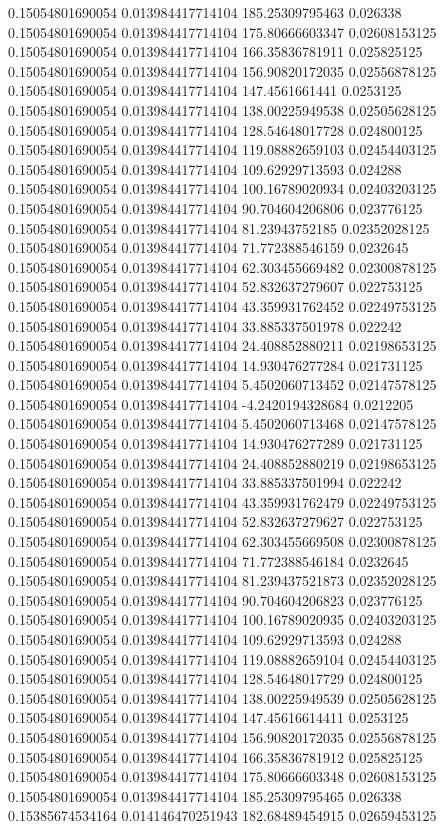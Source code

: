 0.15054801690054 0.013984417714104 185.25309795463 0.026338
0.15054801690054 0.013984417714104 175.80666603347 0.02608153125
0.15054801690054 0.013984417714104 166.35836781911 0.025825125
0.15054801690054 0.013984417714104 156.90820172035 0.02556878125
0.15054801690054 0.013984417714104 147.4561661441 0.0253125
0.15054801690054 0.013984417714104 138.00225949538 0.02505628125
0.15054801690054 0.013984417714104 128.54648017728 0.024800125
0.15054801690054 0.013984417714104 119.08882659103 0.02454403125
0.15054801690054 0.013984417714104 109.62929713593 0.024288
0.15054801690054 0.013984417714104 100.16789020934 0.02403203125
0.15054801690054 0.013984417714104 90.704604206806 0.023776125
0.15054801690054 0.013984417714104 81.23943752185 0.02352028125
0.15054801690054 0.013984417714104 71.772388546159 0.0232645
0.15054801690054 0.013984417714104 62.303455669482 0.02300878125
0.15054801690054 0.013984417714104 52.832637279607 0.022753125
0.15054801690054 0.013984417714104 43.359931762452 0.02249753125
0.15054801690054 0.013984417714104 33.885337501978 0.022242
0.15054801690054 0.013984417714104 24.408852880211 0.02198653125
0.15054801690054 0.013984417714104 14.930476277284 0.021731125
0.15054801690054 0.013984417714104 5.4502060713452 0.02147578125
0.15054801690054 0.013984417714104 -4.2420194328684 0.0212205
0.15054801690054 0.013984417714104 5.4502060713468 0.02147578125
0.15054801690054 0.013984417714104 14.930476277289 0.021731125
0.15054801690054 0.013984417714104 24.408852880219 0.02198653125
0.15054801690054 0.013984417714104 33.885337501994 0.022242
0.15054801690054 0.013984417714104 43.359931762479 0.02249753125
0.15054801690054 0.013984417714104 52.832637279627 0.022753125
0.15054801690054 0.013984417714104 62.303455669508 0.02300878125
0.15054801690054 0.013984417714104 71.772388546184 0.0232645
0.15054801690054 0.013984417714104 81.239437521873 0.02352028125
0.15054801690054 0.013984417714104 90.704604206823 0.023776125
0.15054801690054 0.013984417714104 100.16789020935 0.02403203125
0.15054801690054 0.013984417714104 109.62929713593 0.024288
0.15054801690054 0.013984417714104 119.08882659104 0.02454403125
0.15054801690054 0.013984417714104 128.54648017729 0.024800125
0.15054801690054 0.013984417714104 138.00225949539 0.02505628125
0.15054801690054 0.013984417714104 147.45616614411 0.0253125
0.15054801690054 0.013984417714104 156.90820172035 0.02556878125
0.15054801690054 0.013984417714104 166.35836781912 0.025825125
0.15054801690054 0.013984417714104 175.80666603348 0.02608153125
0.15054801690054 0.013984417714104 185.25309795465 0.026338
0.15385674534164 0.014146470251943 182.68489454915 0.02659453125
